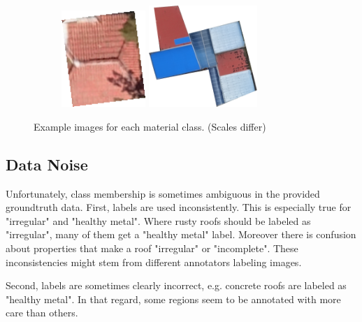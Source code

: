 \documentclass[11pt]{article}
\begin{document}
\begin{figure}
\begin{subfigure}[c]{0.32\textwidth}
		\end{subfigure}
		\begin{subfigure}[c]{0.32\textwidth}
			\centering
			\includegraphics[width=0.35\textwidth]{figures/mat_examples/other1.png}		
			\includegraphics[width=0.45\textwidth]{figures/mat_examples/other2.png}
		\end{subfigure}
	\caption{Example images for each material class. (Scales differ)}
	\label{fig:mat_examples}
	\end{figure}

	\subsection{Data Noise}
	
	Unfortunately, class membership is sometimes ambiguous in the provided groundtruth data. 
	First, labels are used inconsistently. This is especially true for "irregular" and "healthy metal". Where rusty roofs should be labeled as "irregular", many of them get a "healthy metal" label.
	Moreover there is confusion about properties that make a roof "irregular" or "incomplete".
	These inconsistencies might stem from different annotators labeling images.
	
	Second, labels are sometimes clearly incorrect, e.g. concrete roofs are labeled as "healthy metal". In that regard, some regions seem to be annotated with more care than others. 
	
\end{document}
